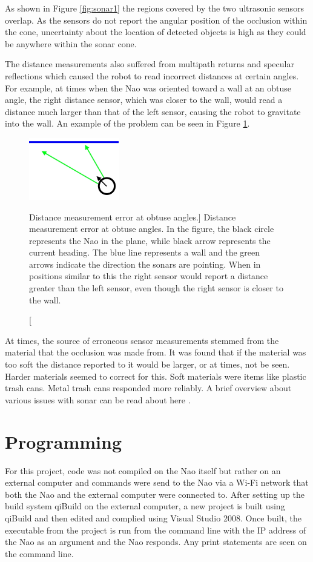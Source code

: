 As shown in Figure \ref{fig:sonar1} the regions covered by the two ultrasonic sensors overlap. As the sensors do not report the angular position of the occlusion within the cone, uncertainty about the location of detected objects is high as they could be anywhere within the sonar cone.

The distance measurements also suffered from multipath returns and specular reflections which caused the robot to read incorrect distances at certain angles. For example, at times when the Nao was oriented toward a wall at an obtuse angle, the right distance sensor, which was closer to the wall, would read a distance much larger than that of the left sensor, causing the robot to gravitate into the wall. An example of the problem can be seen in Figure \ref{fig:sonar2}.

\begin{figure}[h]
	\centering
	\includegraphics[width=0.35\textwidth]{sonar2.jpg}
	\caption
	[Distance measurement error at obtuse angles.]
	{Distance measurement error at obtuse angles. In the figure, the black circle represents the Nao in the plane, 
		while black arrow represents the current heading. The blue line represents a wall and the green arrows indicate
		the direction the sonars are pointing. When in positions similar to this the right sensor would report a distance
		greater than the left sensor, even though the right sensor is closer to the wall.}
	\label{fig:sonar2}
\end{figure}

At times, the source of erroneous sensor measurements stemmed from the material that the occlusion was made from. It was found that if the material was too soft the distance reported to it would be larger, or at times, not be seen. Harder materials seemed to correct for this. Soft materials were items like plastic trash cans. Metal trash cans responded more reliably.
A brief overview about various issues with sonar can be read about here \cite{sonar_issues1}.

\section{Programming}
For this project, code was not compiled on the Nao itself but rather on an external computer and commands were send to the Nao via a Wi-Fi network that both the Nao and the external computer were connected to. After setting up the build system qiBuild 
\cite{qiBuild_tutorial1} on the external computer, a new project is built using qiBuild and then edited and complied using Visual Studio 2008. Once built, the executable from the project is run from the command line with the IP address of the Nao as an argument and the Nao responds. Any print statements are seen on the command line.

